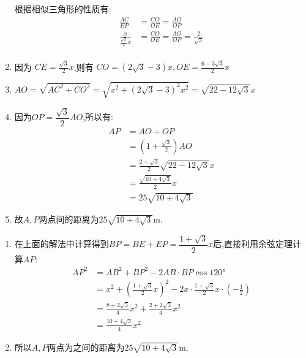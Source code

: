 \begin{questions}
\begin{solution}
\begin{enumerate}[label=\protect\circled{\arabic*}, noitemsep]
			      根据相似三角形的性质有:
			      \begin{align*}
				      \frac{AC}{EP}                 & = \frac{CO}{OE} = \frac{AO}{OP}                     \\
				      \frac{x}{\frac{\sqrt{3}}{2}x} & = \frac{CO}{OE} = \frac{AO}{OP}= \frac{2}{\sqrt{3}} \\
			      \end{align*}
			\item 因为 \( CE=\frac{\sqrt{3}}{2}x \),则有 \( CO = (2\sqrt{3} - 3)x, OE = \frac{6 - 3\sqrt{3}}{2}x \)
			\item \( AO = \sqrt{AC^2 + CO^2} = \sqrt{x^2 + (2\sqrt{3} - 3)^2x^2} = \sqrt{22 - 12\sqrt{3}}x \)
			\item 因为$OP=\dfrac{\sqrt{3}}{2}AO$,所以有:
			      \begin{align*}
				      AP & = AO + OP                                     \\
				         & = (1+\frac{\sqrt{3}}{2})AO                    \\
				         & = \frac{2+\sqrt{3}}{2}\sqrt{22 - 12\sqrt{3}}x \\
				         & = \frac{\sqrt{10 + 4\sqrt{3}}}{2}x            \\
				         & = 25\sqrt{10 + 4\sqrt{3}}
			      \end{align*}
			\item 故$A,P$两点间的距离为$25\sqrt{10+4\sqrt{3}}\unit{\meter}$.
		\end{enumerate}
		\begin{minipage}{\textwidth}
			\color{blue!50!green}
			\begin{enumerate}[label=\protect\circled{\arabic*}]
				\item 在上面的解法中计算得到$BP=BE+EP=\dfrac{1+\sqrt{3}}{2}x$后,直接利用余弦定理计算$AP$:
				      \begin{align*}
					      AP^2 & = AB^2 + BP^2 - 2AB\cdot BP\cos\ang{120}                                                     \\
					           & = x^2 + \left( \frac{1+\sqrt{3}}{2}x \right)^2 - 2x\cdot\frac{1+\sqrt{3}}{2}x\cdot(-\frac12) \\
					           & = \frac{8+2\sqrt{3}}{4}x^2 + \frac{2+2\sqrt{3}}{4}x^2                                        \\
					           & = \frac{10+4\sqrt{3}}{4}x^2
				      \end{align*}
				\item 所以$A,P$两点为之间的距离为$25\sqrt{10+4\sqrt{3}}\unit{\meter}$.
			\end{enumerate}
		\end{minipage}


\end{solution}
\end{questions}
